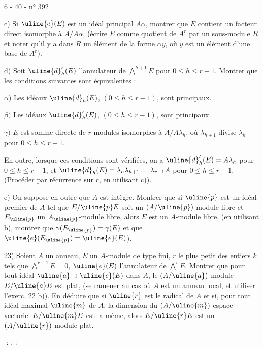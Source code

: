 \begin{center}6 - 40 - \hfill n° 392\end{center}
c) Si $\uline{e}(E)$ est un idéal principal $A\alpha$, montrer que $E$ contient un facteur direct isomorphe à $A/A\alpha$, (écrire $E$ comme quotient de $A^r$ par un sous-module $R$ et noter qu'il y a dans $R$ un élément de la forme $\alpha y$, où $y$ est un élément d'une base de $A^r$).

d) Soit $\uline{d}'_h(E)$ l'annulateur de $\bigwedge^{h+1}E$ pour $0\le h\le r-1$. Montrer que les conditions suivantes sont équivalentes :

$\alpha)$ Les idéaux $\uline{d}_h(E)$, $(0\le h\le r-1)$, sont principaux.

$\beta)$ Les idéaux $\uline{d}'_h(E)$, $(0\le h\le r-1)$, sont principaux.

$\gamma)$ $E$ est somme directe de $r$ modules isomorphes à $A/A\lambda_h$, où $\lambda_{h+1}$ divise $\lambda_h$ pour $0\le h\le r-1$.

En outre, lorsque ces conditions sont vérifiées, on a $\uline{d}'_h(E)=A\lambda_h$ pour $0\le h\le r-1$, et $\uline{d}_h(E)=\lambda_h\lambda_{h+1}\ldots\lambda_{r-1}A$ pour $0\le h\le r-1$. (Procéder par récurrence sur $r$, en utilisant c)).

e) On suppose en outre que $A$ est intègre. Montrer que si $\uline{p}$ est un idéal premier de $A$ tel que $E/\uline{p}E$ soit un $(A/\uline{p})$-module libre et $E_{\uline{p}}$ un $A_{\uline{p}}$-module libre, alors $E$ est un $A$-module libre, (en utilisant b), montrer que $\gamma(E_{\uline{p}})=\gamma(E)$ et que $\uline{e}(E_{\uline{p}})=\uline{e}(E)$).

23) Soient $A$ un anneau, $E$ un $A$-module de type fini, $r$ le plus petit des entiers $k$ tels que $\bigwedge^{r+1}E=0$, $\uline{e}(E)$ l'annulateur de $\bigwedge^rE$. Montrer que pour tout idéal $\uline{a}\supset\uline{e}(E)$ dans $A$, le $(A/\uline{a})$-module $E/\uline{a}E$ est plat, (se ramener au cas où $A$ est un anneau local, et utiliser l'exerc. 22 b)). En déduire que si $\uline{r}$ est le radical de $A$ et si, pour tout idéal maximal $\uline{m}$ de $A$, la dimension du $(A/\uline{m})$-espace vectoriel $E/\uline{m}E$ est la même, alors $E/\uline{r}E$ est un $(A/\uline{r})$-module plat.
\begin{center}-:-:-:-\end{center}
